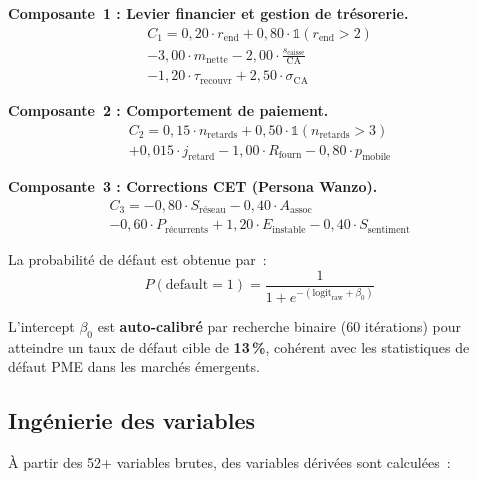 \documentclass[12pt, a4paper, twocolumn]{article}
\begin{document}
\textbf{Composante~1 : Levier financier et gestion de trésorerie.}
\begin{multline}
\label{eq:c1}
  C_1 = 0{,}20 \cdot r_{\text{end}} + 0{,}80 \cdot \mathbb{1}(r_{\text{end}} > 2) \\
  - 3{,}00 \cdot m_{\text{nette}} - 2{,}00 \cdot \frac{s_{\text{caisse}}}{\text{CA}} \\
  - 1{,}20 \cdot \tau_{\text{recouvr}} + 2{,}50 \cdot \sigma_{\text{CA}}
\end{multline}

\textbf{Composante~2 : Comportement de paiement.}
\begin{multline}
\label{eq:c2}
  C_2 = 0{,}15 \cdot n_{\text{retards}} + 0{,}50 \cdot \mathbb{1}(n_{\text{retards}} > 3) \\
  + 0{,}015 \cdot j_{\text{retard}} - 1{,}00 \cdot R_{\text{fourn}} - 0{,}80 \cdot p_{\text{mobile}}
\end{multline}

\textbf{Composante~3 : Corrections CET (Persona Wanzo).}
\begin{multline}
\label{eq:c3}
  C_3 = -0{,}80 \cdot S_{\text{réseau}} - 0{,}40 \cdot A_{\text{assoc}} \\
  - 0{,}60 \cdot P_{\text{récurrents}} + 1{,}20 \cdot E_{\text{instable}} - 0{,}40 \cdot S_{\text{sentiment}}
\end{multline}

La probabilité de défaut est obtenue par~:
\begin{equation}
\label{eq:proba}
  P(\text{default} = 1) = \frac{1}{1 + e^{-(\text{logit}_{\text{raw}} + \beta_0)}}
\end{equation}

L'intercept $\beta_0$ est \textbf{auto-calibré} par recherche binaire (60 itérations) pour atteindre un taux de défaut cible de \textbf{13\,\%}, cohérent avec les statistiques de défaut PME dans les marchés émergents.

\subsection{Ingénierie des variables}
\label{subsec:feature_eng}

À partir des 52+ variables brutes, des variables dérivées sont calculées~:
\end{document}
